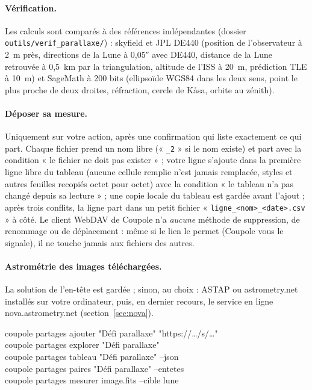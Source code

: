 \paragraph{Vérification.} Les calculs sont comparés à des références indépendantes (dossier
\texttt{outils/verif\_parallaxe/}) : skyfield et JPL DE440 (position de l'observateur à 2~m près, directions de la Lune
à 0,05″ avec DE440, distance de la Lune retrouvée à 0,5~km par la triangulation, altitude de l'ISS à 20~m, prédiction
TLE à 10~m) et SageMath à 200 bits (ellipsoïde WGS84 dans les deux sens, point le plus proche de deux droites,
réfraction, cercle de Kåsa, orbite au zénith).

\paragraph{Déposer sa mesure.} Uniquement sur votre action, après une confirmation qui liste exactement ce qui part.
Chaque fichier prend un nom libre (« \texttt{\_2} » si le nom existe) et part avec la condition « le fichier ne doit
pas exister » ; votre ligne s'ajoute dans la première ligne libre du tableau (aucune cellule remplie n'est jamais
remplacée, styles et autres feuilles recopiés octet pour octet) avec la condition « le tableau n'a pas changé depuis
sa lecture » ; une copie locale du tableau est gardée avant l'ajout ; après trois conflits, la ligne part dans un
petit fichier « \texttt{ligne\_<nom>\_<date>.csv} » à côté. Le client WebDAV de Coupole n'a \emph{aucune} méthode de
suppression, de renommage ou de déplacement : même si le lien le permet (Coupole vous le signale), il ne touche jamais
aux fichiers des autres.

\paragraph{Astrométrie des images téléchargées.} La solution de l'en-tête est gardée ; sinon, au choix : ASTAP ou
astrometry.net installés sur votre ordinateur, puis, en dernier recours, le service en ligne nova.astrometry.net
(section~\ref{sec:nova}).

\begin{ccode}
coupole partages ajouter "Défi parallaxe" "https://…/s/…"\\
coupole partages explorer "Défi parallaxe"\\
coupole partages tableau "Défi parallaxe" --json\\
coupole partages paires "Défi parallaxe" --entetes\\
coupole partages mesurer image.fits --cible lune
\end{ccode}

